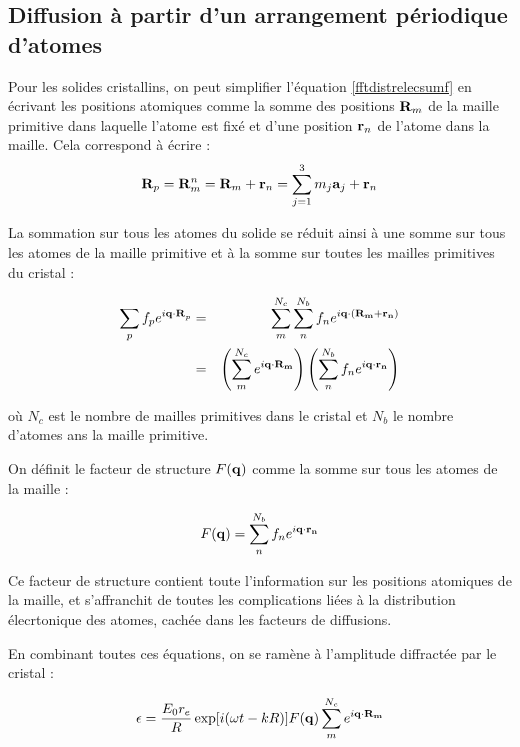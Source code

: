 \subsection{Diffusion à partir d'un arrangement périodique d'atomes}

Pour les solides cristallins, on peut simplifier l'équation \ref{fftdistrelecsumf} en écrivant les positions atomiques comme la somme des
positions $\mathbf{R}_m$ de la maille primitive dans laquelle l'atome est fixé
et d'une position $\mathbf{r}_n$ de l'atome dans la maille. Cela correspond à
écrire :
\begin{equation}
    \mathbf{R}_p = \mathbf{R}_m^n = \mathbf{R}_m + \mathbf{r}_n =
    \sum_{j=1}^3 m_j \mathbf{a}_j + \mathbf{r}_n
\end{equation}

La sommation sur tous les atomes du solide se réduit ainsi à une somme sur tous
les atomes de la maille primitive et à la somme sur toutes les mailles primitives
du cristal :

\begin{eqnarray}
    \sum_p f_p e^{i\mathbf{q \cdot R}_p} & = & \sum_m^{N_c} \sum_n^{N_b}
    f_n e^{i\mathbf{q\cdot(R_m + r_n)}}\\
    & = & \left( \sum_m^{N_c} e^{i\mathbf{q\cdot R_m}} \right)
    \left( \sum_n^{N_b} f_n e^{i\mathbf{q\cdot r_n}} \right)
\end{eqnarray}

où $N_c$ est le nombre de mailles primitives dans le cristal et $N_b$ le nombre
d'atomes ans la maille primitive.

On définit le facteur de structure $F(\mathbf{q})$ comme la somme sur tous les
atomes de la maille :

\begin{equation}
    F(\mathbf{q}) = \sum_n^{N_b} f_n e^{i \mathbf{q \cdot r_n}}
\end{equation}

Ce facteur de structure contient toute l'information sur les positions atomiques
de la maille, et s'affranchit de toutes les complications liées à la distribution
élecrtonique des atomes, cachée dans les facteurs de diffusions.

En combinant toutes ces équations, on se ramène à l'amplitude diffractée par le
cristal :

\begin{equation}
    \epsilon = \frac{E_0 r_e}{R} \exp[i(\omega t - k R)] F(\mathbf{q}) \sum_m^{N_c} e^{i\mathbf{q\cdot R_m}}
    \label{ampdiffract}
\end{equation}


